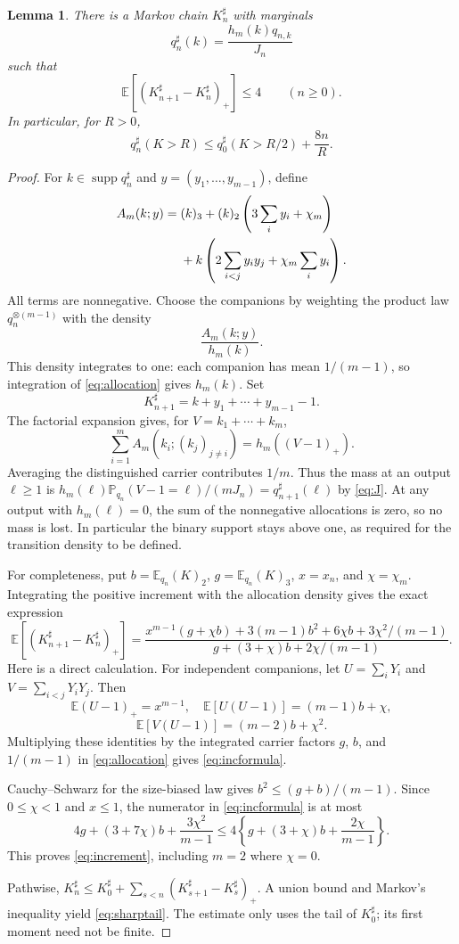 \documentclass[11pt,letterpaper,reqno]{amsart}
\theoremstyle{plain}
\newtheorem{lemma}[theorem]{Lemma}
\newcommand{\E}{\mathbb E}\newcommand{\Pp}{\mathbb P}
\DeclareMathOperator{\supp}{supp}
\begin{document}
\begin{lemma}\label{lem:spine}
There is a Markov chain $K_n^\sharp$ with marginals
\[
 q_n^\sharp(k)=\frac{h_m(k)q_{n,k}}{J_n}
\]
such that
\begin{equation}\label{eq:increment}
 \E[(K_{n+1}^\sharp-K_n^\sharp)_+]\le4\qquad(n\ge0).
\end{equation}
In particular, for $R>0$,
\begin{equation}\label{eq:sharptail}
 q_n^\sharp(K>R)\le q_0^\sharp(K>R/2)+\frac{8n}{R}.
\end{equation}
\end{lemma}
\begin{proof}
For $k\in\supp q_n^\sharp$ and $y=(y_1,\ldots,y_{m-1})$, define
\begin{align}\label{eq:allocation}
 A_m(k;y)={}&(k)_3+(k)_2\left(3\sum_i y_i+\chi_m\right)\notag\\
 &+k\left(2\sum_{i<j}y_iy_j+\chi_m\sum_i y_i\right).
\end{align}
All terms are nonnegative. Choose the companions by weighting the product law $q_n^{\otimes(m-1)}$ with the density
\[
 \frac{A_m(k;y)}{h_m(k)}.
\]
This density integrates to one: each companion has mean $1/(m-1)$, so integration of \eqref{eq:allocation} gives $h_m(k)$. Set
\[
 K_{n+1}^\sharp=k+y_1+\cdots+y_{m-1}-1.
\]
The factorial expansion gives, for $V=k_1+\cdots+k_m$,
\[
 \sum_{i=1}^m A_m(k_i;(k_j)_{j\ne i})=h_m((V-1)_+).
\]
Averaging the distinguished carrier contributes $1/m$. Thus the mass at an output $\ell\ge1$ is
$h_m(\ell)\Pp_{q_n}(V-1=\ell)/(mJ_n)=q_{n+1}^\sharp(\ell)$ by \eqref{eq:J}. At any output with $h_m(\ell)=0$, the sum of the nonnegative allocations is zero, so no mass is lost. In particular the binary support stays above one, as required for the transition density to be defined.

For completeness, put $b=\E_{q_n}(K)_2$, $g=\E_{q_n}(K)_3$, $x=x_n$, and $\chi=\chi_m$. Integrating the positive increment with the allocation density gives the exact expression
\begin{equation}\label{eq:incformula}
 \E[(K_{n+1}^\sharp-K_n^\sharp)_+]
 =\frac{x^{m-1}(g+\chi b)+3(m-1)b^2+6\chi b+3\chi^2/(m-1)}
 {g+(3+\chi)b+2\chi/(m-1)}.
\end{equation}
Here is a direct calculation. For independent companions, let $U=\sum_iY_i$ and $V=\sum_{i<j}Y_iY_j$. Then
\[
 \E(U-1)_+=x^{m-1},\quad \E[U(U-1)]=(m-1)b+\chi,
\]
\[
 \E[V(U-1)]=(m-2)b+\chi^2.
\]
Multiplying these identities by the integrated carrier factors $g$, $b$, and $1/(m-1)$ in \eqref{eq:allocation} gives \eqref{eq:incformula}.

Cauchy--Schwarz for the size-biased law gives
$b^2\le(g+b)/(m-1)$. Since $0\le\chi<1$ and $x\le1$, the numerator in \eqref{eq:incformula} is at most
\[
 4g+(3+7\chi)b+\frac{3\chi^2}{m-1}
 \le4\left\{g+(3+\chi)b+\frac{2\chi}{m-1}\right\}.
\]
This proves \eqref{eq:increment}, including $m=2$ where $\chi=0$.

Pathwise, $K_n^\sharp\le K_0^\sharp+\sum_{s<n}(K_{s+1}^\sharp-K_s^\sharp)_+$. A union bound and Markov's inequality yield \eqref{eq:sharptail}. The estimate only uses the tail of $K_0^\sharp$; its first moment need not be finite.
\end{proof}
\end{document}
